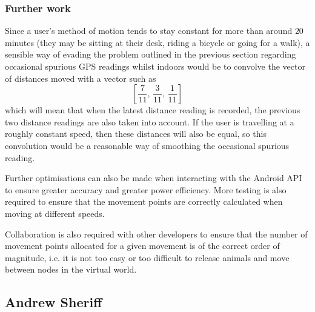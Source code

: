 \documentclass[12pt,a4paper,twoside]{article}
\begin{document}
\subsubsection{Further work}
Since a user's method of motion tends to stay constant for more than around $20$ minutes (they may be sitting at their desk, riding a bicycle or going for a walk), a sensible way of evading the problem outlined in the previous section regarding occasional spurious GPS readings whilst indoors would be to convolve the vector of distances moved with a vector such as
\[
\left[{ \frac{7}{11},\, \frac{3}{11},\, \frac{1}{11}}\right]
\]
which will mean that when the latest distance reading is recorded, the previous two distance readings are also taken into account. If the user is travelling at a roughly constant speed, then these distances will also be equal, so this convolution would be a reasonable way of smoothing the occasional spurious reading.

Further optimisations can also be made when interacting with the Android API to ensure greater accuracy and greater power efficiency. More testing is also required to ensure that the movement points are correctly calculated when moving at different speeds.

Collaboration is also required with other developers to ensure that the number of movement points allocated for a given movement is of the correct order of magnitude, i.e. it is not too easy or too difficult to release animals and move between nodes in the virtual world.

\subsection{Andrew Sheriff}
\end{document}
